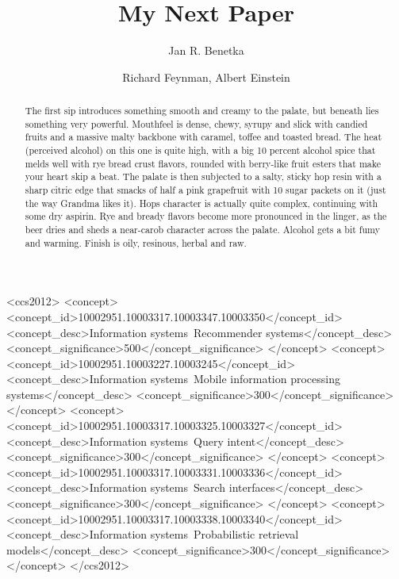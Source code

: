 \documentclass[sigconf]{acmart}
\newcommand{\dummy}[1]{\textcolor{light-gray}{#1}}
\begin{document}
\title{My Next Paper}



\author{Jan R. Benetka}

\author{Richard Feynman, Albert Einstein}



\begin{abstract}
\dummy{The first sip introduces something smooth and creamy to the palate, but beneath lies something very powerful. Mouthfeel is dense, chewy, syrupy and slick with candied fruits and a massive malty backbone with caramel, toffee and toasted bread. The heat (perceived alcohol) on this one is quite high, with a big 10 percent alcohol spice that melds well with rye bread crust flavors, rounded with berry-like fruit esters that make your heart skip a beat. The palate is then subjected to a salty, sticky hop resin with a sharp citric edge that smacks of half a pink grapefruit with 10 sugar packets on it (just the way Grandma likes it). Hops character is actually quite complex, continuing with some dry aspirin. Rye and bready flavors become more pronounced in the linger, as the beer dries and sheds a near-carob character across the palate. Alcohol gets a bit fumy and warming. Finish is oily, resinous, herbal and raw.}
\end{abstract}

%
%
\begin{CCSXML}
<ccs2012>
<concept>
<concept_id>10002951.10003317.10003347.10003350</concept_id>
<concept_desc>Information systems~Recommender systems</concept_desc>
<concept_significance>500</concept_significance>
</concept>
<concept>
<concept_id>10002951.10003227.10003245</concept_id>
<concept_desc>Information systems~Mobile information processing systems</concept_desc>
<concept_significance>300</concept_significance>
</concept>
<concept>
<concept_id>10002951.10003317.10003325.10003327</concept_id>
<concept_desc>Information systems~Query intent</concept_desc>
<concept_significance>300</concept_significance>
</concept>
<concept>
<concept_id>10002951.10003317.10003331.10003336</concept_id>
<concept_desc>Information systems~Search interfaces</concept_desc>
<concept_significance>300</concept_significance>
</concept>
<concept>
<concept_id>10002951.10003317.10003338.10003340</concept_id>
<concept_desc>Information systems~Probabilistic retrieval models</concept_desc>
<concept_significance>300</concept_significance>
</concept>
</ccs2012>
\end{CCSXML}
\end{document}
